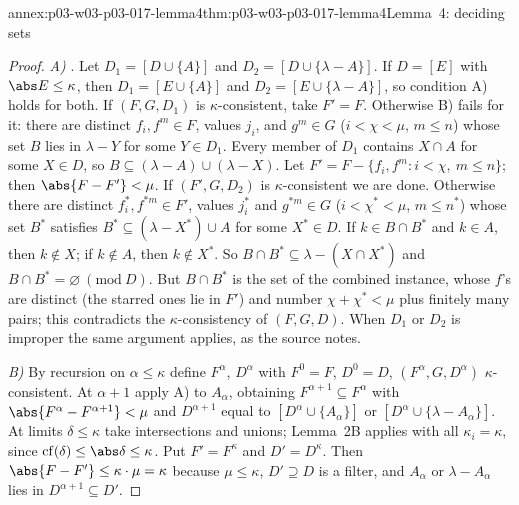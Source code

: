 \begin{annexitem}{annex:p03-w03-p03-017-lemma4}{thm:p03-w03-p03-017-lemma4}{Lemma~4: deciding sets}
\begin{proof}
\emph{A)} \cite[pp.~228--229]{Shelah1971Ultrapowers}.  Let
\(D_1=[D\cup\{A\}]\) and \(D_2=[D\cup\{\lambda-A\}]\).  If \(D=[E]\) with
\(\abs E\le\kappa\), then \(D_1=[E\cup\{A\}]\) and \(D_2=[E\cup\{\lambda-A\}]\),
so condition A) holds for both.  If \((F,G,D_1)\) is \(\kappa\)-consistent,
take \(F'=F\).  Otherwise B) fails for it: there are distinct
\(f_i,f^m\in F\), values \(j_i\), and \(g^m\in G\) (\(i<\chi<\mu\),
\(m\le n\)) whose set \(B\) lies in \(\lambda-Y\) for some \(Y\in D_1\).  Every
member of \(D_1\) contains \(X\cap A\) for some \(X\in D\), so
\(B\subseteq(\lambda-A)\cup(\lambda-X)\).  Let
\(F'=F-\{f_i,f^m:i<\chi,\ m\le n\}\); then \(\abs{F-F'}<\mu\).  If
\((F',G,D_2)\) is \(\kappa\)-consistent we are done.  Otherwise there are
distinct \(f^*_i,f^{*m}\in F'\), values \(j^*_i\) and \(g^{*m}\in G\)
(\(i<\chi^*<\mu\), \(m\le n^*\)) whose set \(B^*\) satisfies
\(B^*\subseteq(\lambda-X^*)\cup A\) for some \(X^*\in D\).  If \(k\in B\cap
B^*\) and \(k\in A\), then \(k\notin X\); if \(k\notin A\), then
\(k\notin X^*\).  So \(B\cap B^*\subseteq\lambda-(X\cap X^*)\) and
\(B\cap B^*=\varnothing\ (\mathrm{mod}\ D)\).  But \(B\cap B^*\) is the set
of the combined instance, whose \(f\)'s are distinct (the starred ones lie in
\(F'\)) and number \(\chi+\chi^*<\mu\) plus finitely many pairs; this
contradicts the \(\kappa\)-consistency of \((F,G,D)\).  When \(D_1\) or
\(D_2\) is improper the same argument applies, as the source notes.

\emph{B)}  By recursion on \(\alpha\le\kappa\) define
\(F^\alpha\), \(D^\alpha\) with \(F^0=F\), \(D^0=D\), \((F^\alpha,G,D^\alpha)\)
\(\kappa\)-consistent.  At \(\alpha+1\) apply A) to \(A_\alpha\), obtaining
\(F^{\alpha+1}\subseteq F^\alpha\) with
\(\abs{F^\alpha-F^{\alpha+1}}<\mu\) and \(D^{\alpha+1}\) equal to
\([D^\alpha\cup\{A_\alpha\}]\) or \([D^\alpha\cup\{\lambda-A_\alpha\}]\).  At
limits \(\delta\le\kappa\) take intersections and unions; Lemma~2B applies with
all \(\kappa_i=\kappa\), since \(\mathrm{cf}(\delta)\le\abs\delta\le\kappa\).
Put \(F'=F^\kappa\) and \(D'=D^\kappa\).  Then
\(\abs{F-F'}\le\kappa\cdot\mu=\kappa\) because \(\mu\le\kappa\), \(D'\supseteq D\)
is a filter, and \(A_\alpha\) or \(\lambda-A_\alpha\) lies in
\(D^{\alpha+1}\subseteq D'\).
\end{proof}
\end{annexitem}


